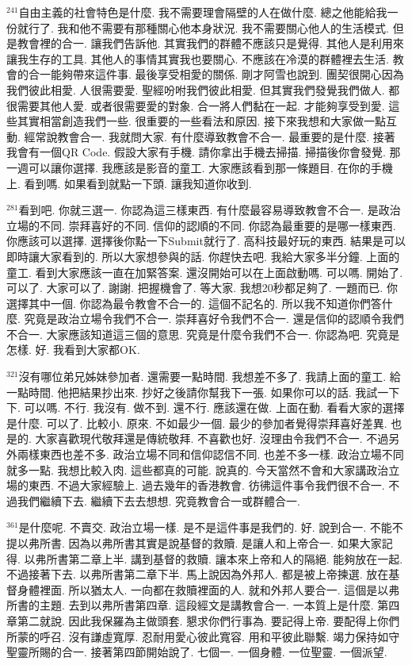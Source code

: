 \documentclass{book}
\begin{document}
$^{241}$自由主義的社會特色是什麼.
我不需要理會隔壁的人在做什麼.
總之他能給我一份就行了.
我和他不需要有那種關心他本身狀況.
我不需要關心他人的生活模式.
但是教會裡的合一.
讓我們告訴他.
其實我們的群體不應該只是覺得.
其他人是利用來讓我生存的工具.
其他人的事情其實我也要關心.
不應該在冷漠的群體裡去生活.
教會的合一能夠帶來這件事.
最後享受相愛的關係.
剛才阿雪也說到.
團契很開心因為我們彼此相愛.
人很需要愛.
聖經吩咐我們彼此相愛.
但其實我們發覺我們做人.
都很需要其他人愛.
或者很需要愛的對象.
合一將人們黏在一起.
才能夠享受到愛.
這些其實相當創造我們一些.
很重要的一些看法和原因.
接下來我想和大家做一點互動.
經常說教會合一.
我就問大家.
有什麼導致教會不合一.
最重要的是什麼.
接著我會有一個QR Code.
假設大家有手機.
請你拿出手機去掃描.
掃描後你會發覺.
那一週可以讓你選擇.
我應該是影音的童工.
大家應該看到那一條題目.
在你的手機上.
看到嗎.
如果看到就點一下頭.
讓我知道你收到.

$^{281}$看到吧.
你就三選一.
你認為這三樣東西.
有什麼最容易導致教會不合一.
是政治立場的不同.
崇拜喜好的不同.
信仰的認順的不同.
你認為最重要的是哪一樣東西.
你應該可以選擇.
選擇後你點一下Submit就行了.
高科技最好玩的東西.
結果是可以即時讓大家看到的.
所以大家想參與的話.
你趕快去吧.
我給大家多半分鐘.
上面的童工.
看到大家應該一直在加緊答案.
還沒開始可以在上面啟動嗎.
可以嗎.
開始了.
可以了.
大家可以了.
謝謝.
把握機會了.
等大家.
我想20秒都足夠了.
一題而已.
你選擇其中一個.
你認為最令教會不合一的.
這個不記名的.
所以我不知道你們答什麼.
究竟是政治立場令我們不合一.
崇拜喜好令我們不合一.
還是信仰的認順令我們不合一.
大家應該知道這三個的意思.
究竟是什麼令我們不合一.
你認為吧.
究竟是怎樣.
好.
我看到大家都OK.

$^{321}$沒有哪位弟兄姊妹參加者.
還需要一點時間.
我想差不多了.
我請上面的童工.
給一點時間.
他把結果抄出來.
抄好之後請你幫我下一張.
如果你可以的話.
我試一下下.
可以嗎.
不行.
我沒有.
做不到.
還不行.
應該還在做.
上面在動.
看看大家的選擇是什麼.
可以了.
比較小.
原來.
不如最少一個.
最少的參加者覺得崇拜喜好差異.
也是的.
大家喜歡現代敬拜還是傳統敬拜.
不喜歡也好.
沒理由令我們不合一.
不過另外兩樣東西也差不多.
政治立場不同和信仰認信不同.
也差不多一樣.
政治立場不同就多一點.
我想比較入肉.
這些都真的可能.
說真的.
今天當然不會和大家講政治立場的東西.
不過大家經驗上.
過去幾年的香港教會.
彷彿這件事令我們很不合一.
不過我們繼續下去.
繼續下去去想想.
究竟教會合一或群體合一.

$^{361}$是什麼呢.
不賣交.
政治立場一樣.
是不是這件事是我們的.
好.
說到合一.
不能不提以弗所書.
因為以弗所書其實是說基督的救贖.
是讓人和上帝合一.
如果大家記得.
以弗所書第二章上半.
講到基督的救贖.
讓本來上帝和人的隔絕.
能夠放在一起.
不過接著下去.
以弗所書第二章下半.
馬上說因為外邦人.
都是被上帝揀選.
放在基督身體裡面.
所以猶太人.
一向都在救贖裡面的人.
就和外邦人要合一.
這個是以弗所書的主題.
去到以弗所書第四章.
這段經文是講教會合一.
一本質上是什麼.
第四章第二就說.
因此我保羅為主做頭套.
懇求你們行事為.
要記得上帝.
要配得上你們所蒙的呼召.
沒有謙虛寬厚.
忍耐用愛心彼此寬容.
用和平彼此聯繫.
竭力保持如守聖靈所賜的合一.
接著第四節開始說了.
七個一.
一個身體.
一位聖靈.
一個派望.
\end{document}

